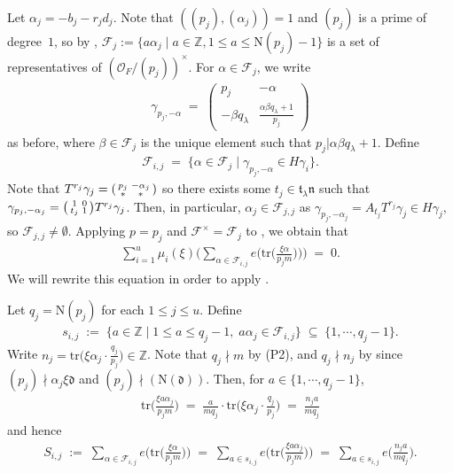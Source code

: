 \documentclass[11pt]{amsart}
\theoremstyle{remark}
\newcommand\m[1]{\begin{pmatrix}#1\end{pmatrix}}
\newcommand\sm[1]{\begin{psmallmatrix}#1\end{psmallmatrix}}
\newcommand\cl[1]{\mathcal{#1}}
\newcommand\fr[1]{\mathfrak{#1}}
\newcommand{\inte}{\mathbb{Z}}
\newcommand{\clo}{\mathcal{O}}
\newcommand{\eq}{\;=\;}
\newcommand{\deq}{\;:=\;}
\newcommand{\N}{\mathrm{N}}
\newcommand{\tr}{\mathrm{tr}}
\begin{document}
Let $\alpha_j=-b_j-r_jd_j$. Note that $((p_j),(\alpha_j))=1$ and $(p_j)$ is a prime of degree~$1$, so by , $\cl{F}_j:=\{a\alpha_j\mid a\in\inte,1\leq a\leq\N(p_j)-1\}$ is a set of representatives of $(\clo_F/(p_j))^\times$. For $\alpha\in\cl{F}_j$, we write
\begin{align*}
    \gamma_{p_j,-\alpha}\eq\m{p_j&-\alpha\\-\beta q_\lambda&\frac{\alpha\beta q_\lambda+1}{p_j}}
\end{align*}
as before, where $\beta\in\cl{F}_j$ is the unique element such that $p_j|\alpha\beta q_\lambda+1$. Define
\begin{align*}
    \cl{F}_{i,j}\eq \{\alpha\in \cl{F}_j\mid \gamma_{p_j,-\alpha}\in H\gamma_i\}.
\end{align*}
Note that $T^{r_j}\gamma_j=\sm{p_j&-\alpha_j\\**&*}$ so there exists some $t_j\in\fr{t}_\lambda\fr{n}$ such that $\gamma_{p_j,-\alpha_j}=\sm{1&0\\t_j&1}T^{r_j}\gamma_j$.
Then, in particular, $\alpha_j\in \cl{F}_{j,j}$ as $\gamma_{p_j,-\alpha_j}=A_{t_j}T^{r_j}\gamma_j\in H\gamma_j$, so $\cl{F}_{j,j}\neq\emptyset$. Applying $p=p_j$ and $\cl{F}^\times=\cl{F}_j$ to , we obtain that
\begin{align}
\label{lambdaexposumij}
    \sum_{i=1}^u\mu_i(\xi)\bigg(\sum_{\alpha\in \cl{F}_{i,j}}e\big(\tr\big(\tfrac{\xi\alpha}{p_jm}\big)\big)\bigg)\eq 0.
\end{align}
We will rewrite this equation in order to apply .

Let $q_j=\N(p_j)$ for each $1\leq j\leq u$. Define
\begin{align*}
    s_{i,j}\deq\{a\in\inte\mid 1\leq a\leq q_j-1, \;a\alpha_j\in \cl{F}_{i,j}\}\;\subseteq\;\{1,\cdots,q_j-1\}.
\end{align*}
Write $n_j=\tr\big(\xi\alpha_j\cdot\tfrac{q_j}{p_j}\big)\in\inte$. Note that $q_j\nmid m$ by (P2), and $q_j\nmid n_j$ by  since $(p_j)\nmid \alpha_j\xi\fr{d}$ and $(p_j)\nmid(\N(\fr{d}))$. Then, for $a\in\{1,\cdots,q_j-1\}$, 
\begin{align*}
    \tr\bigg(\frac{\xi a\alpha_j}{p_jm}\bigg)\eq\frac{a}{mq_j}\cdot\tr\bigg(\xi\alpha_j \cdot\frac{q_j}{p_j}\bigg)\eq\frac{n_ja}{mq_j}
\end{align*}
and hence
\begin{align*}
    S_{i,j}\deq\sum_{\alpha\in \cl{F}_{i,j}}e\big(\tr\big(\tfrac{\xi\alpha}{p_jm}\big)\big)\eq\sum_{a\in s_{i,j}}e\big(\tr\big(\tfrac{\xi a\alpha_j}{p_jm}\big)\big)\eq\sum_{a\in s_{i,j}}e\big(\tfrac{n_ja}{mq_j}\big).
\end{align*}
\end{document}
